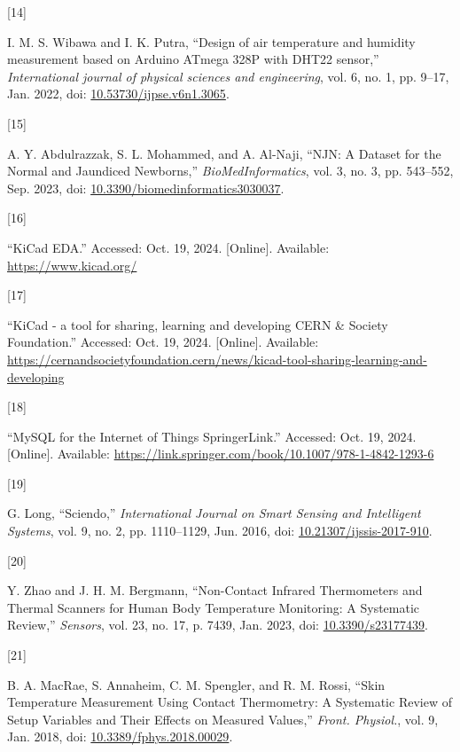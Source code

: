 \documentclass{article}
\newlength{\cslhangindent}
\newlength{\csllabelwidth}
\newenvironment{CSLReferences}[2] %
 {\begin{list}{}{%
  \setlength{\itemindent}{0pt}
  \setlength{\leftmargin}{0pt}
  \setlength{\parsep}{0pt}
  \ifodd #1
   \setlength{\leftmargin}{\cslhangindent}
   \setlength{\itemindent}{-1\cslhangindent}
  \fi
  \setlength{\itemsep}{#2\baselineskip}}}
 {\end{list}}
\newcommand{\CSLLeftMargin}[1]{\parbox[t]{\csllabelwidth}{#1}}
\newcommand{\CSLRightInline}[1]{\parbox[t]{\linewidth - \csllabelwidth}{#1}\break}
\begin{document}
\begin{CSLReferences}{0}{0}
\CSLLeftMargin{{[}14{]} }%
\CSLRightInline{I. M. S. Wibawa and I. K. Putra, {``Design of air
temperature and humidity measurement based on {Arduino} {ATmega} {328P}
with {DHT22} sensor,''} \emph{International journal of physical sciences
and engineering}, vol. 6, no. 1, pp. 9--17, Jan. 2022, doi:
\href{https://doi.org/10.53730/ijpse.v6n1.3065}{10.53730/ijpse.v6n1.3065}.}

\CSLLeftMargin{{[}15{]} }%
\CSLRightInline{A. Y. Abdulrazzak, S. L. Mohammed, and A. Al-Naji,
{``{NJN}: {A} {Dataset} for the {Normal} and {Jaundiced} {Newborns},''}
\emph{BioMedInformatics}, vol. 3, no. 3, pp. 543--552, Sep. 2023, doi:
\href{https://doi.org/10.3390/biomedinformatics3030037}{10.3390/biomedinformatics3030037}.}

\CSLLeftMargin{{[}16{]} }%
\CSLRightInline{{``{KiCad} {EDA}.''} Accessed: Oct. 19, 2024.
{[}Online{]}. Available: \url{https://www.kicad.org/}}

\CSLLeftMargin{{[}17{]} }%
\CSLRightInline{{``{KiCad} - a tool for sharing, learning and developing
{\textbar} {CERN} \& {Society} {Foundation}.''} Accessed: Oct. 19, 2024.
{[}Online{]}. Available:
\url{https://cernandsocietyfoundation.cern/news/kicad-tool-sharing-learning-and-developing}}

\CSLLeftMargin{{[}18{]} }%
\CSLRightInline{{``{MySQL} for the {Internet} of {Things} {\textbar}
{SpringerLink}.''} Accessed: Oct. 19, 2024. {[}Online{]}. Available:
\url{https://link.springer.com/book/10.1007/978-1-4842-1293-6}}

\CSLLeftMargin{{[}19{]} }%
\CSLRightInline{G. Long, {``Sciendo,''} \emph{International Journal on
Smart Sensing and Intelligent Systems}, vol. 9, no. 2, pp. 1110--1129,
Jun. 2016, doi:
\href{https://doi.org/10.21307/ijssis-2017-910}{10.21307/ijssis-2017-910}.}

\CSLLeftMargin{{[}20{]} }%
\CSLRightInline{Y. Zhao and J. H. M. Bergmann, {``Non-{Contact}
{Infrared} {Thermometers} and {Thermal} {Scanners} for {Human} {Body}
{Temperature} {Monitoring}: {A} {Systematic} {Review},''}
\emph{Sensors}, vol. 23, no. 17, p. 7439, Jan. 2023, doi:
\href{https://doi.org/10.3390/s23177439}{10.3390/s23177439}.}

\CSLLeftMargin{{[}21{]} }%
\CSLRightInline{B. A. MacRae, S. Annaheim, C. M. Spengler, and R. M.
Rossi, {``Skin {Temperature} {Measurement} {Using} {Contact}
{Thermometry}: {A} {Systematic} {Review} of {Setup} {Variables} and
{Their} {Effects} on {Measured} {Values},''} \emph{Front. Physiol.},
vol. 9, Jan. 2018, doi:
\href{https://doi.org/10.3389/fphys.2018.00029}{10.3389/fphys.2018.00029}.}

\end{CSLReferences}



\end{document}
